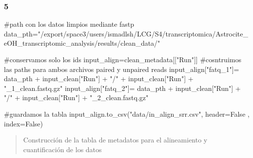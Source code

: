 \documentclass[
  10pt,
]{article}
\newenvironment{Shaded}{\begin{snugshade}}{\end{snugshade}}
\newcommand{\CommentTok}[1]{\textcolor[rgb]{0.37,0.37,0.37}{#1}}
\newcommand{\NormalTok}[1]{\textcolor[rgb]{0.00,0.23,0.31}{#1}}
\newcommand{\OperatorTok}[1]{\textcolor[rgb]{0.37,0.37,0.37}{#1}}
\newcommand{\StringTok}[1]{\textcolor[rgb]{0.13,0.47,0.30}{#1}}
\newcommand{\VariableTok}[1]{\textcolor[rgb]{0.07,0.07,0.07}{#1}}
\begin{document}
\subsubsection{5}\label{section-4}

\begin{Shaded}
\begin{Highlighting}[]
\CommentTok{\#path con los datos limpios mediante fastp}
\NormalTok{data\_pth}\OperatorTok{=}\StringTok{"/export/space3/users/ismadlsh/LCG/S4/transcriptomica/Astrocite\_eOH\_transcriptomic\_analysis/results/clean\_data/"}

\CommentTok{\#conservamos solo los ids}
\NormalTok{input\_align}\OperatorTok{=}\NormalTok{clean\_metadata[[}\StringTok{"Run"}\NormalTok{]]}
\CommentTok{\#cosntruimos las paths para ambos archivos paired y unpaired reads}
\NormalTok{input\_align[}\StringTok{"fatq\_1"}\NormalTok{]}\OperatorTok{=}\NormalTok{ data\_pth }\OperatorTok{+}\NormalTok{ input\_clean[}\StringTok{"Run"}\NormalTok{] }\OperatorTok{+} \StringTok{"/"} \OperatorTok{+}\NormalTok{ input\_clean[}\StringTok{"Run"}\NormalTok{] }\OperatorTok{+} \StringTok{"\_1\_clean.fastq.gz"} 
\NormalTok{input\_align[}\StringTok{"fatq\_2"}\NormalTok{]}\OperatorTok{=}\NormalTok{ data\_pth }\OperatorTok{+}\NormalTok{ input\_clean[}\StringTok{"Run"}\NormalTok{] }\OperatorTok{+} \StringTok{"/"} \OperatorTok{+}\NormalTok{ input\_clean[}\StringTok{"Run"}\NormalTok{] }\OperatorTok{+} \StringTok{"\_2\_clean.fastq.gz"} 

\CommentTok{\#guardamos la tabla }
\NormalTok{input\_align.to\_csv(}\StringTok{"data/in\_align\_srr.csv"}\NormalTok{, header}\OperatorTok{=}\VariableTok{False}\NormalTok{ , index}\OperatorTok{=}\VariableTok{False}\NormalTok{)}
\end{Highlighting}
\end{Shaded}

\begin{quote}
Construcción de la tabla de metadatos para el alineamiento y
cuantificación de los datos
\end{quote}
\end{document}

